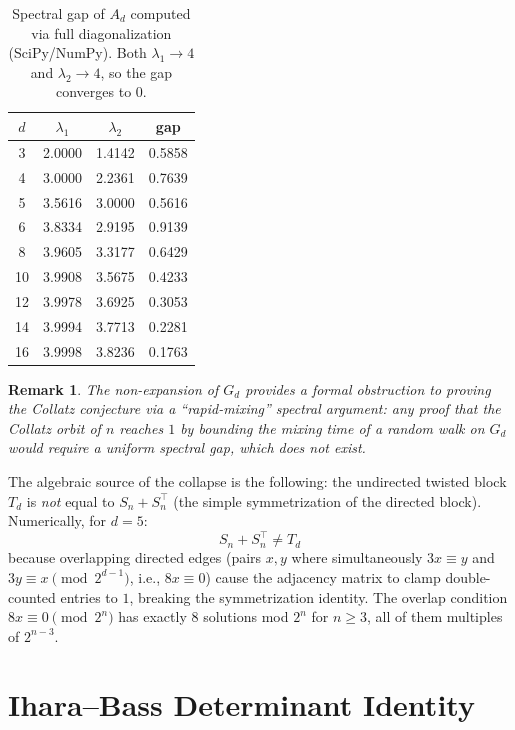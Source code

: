 \documentclass[12pt]{article}
\newtheorem{remark}[theorem]{Remark}
\begin{document}
\begin{table}[h!]
  \centering
  \begin{tabular}{c c c c}
    \hline
    $d$ & $\lambda_1$ & $\lambda_2$ & gap \\
    \hline
    3  & 2.0000 & 1.4142 & 0.5858 \\
    4  & 3.0000 & 2.2361 & 0.7639 \\
    5  & 3.5616 & 3.0000 & 0.5616 \\
    6  & 3.8334 & 2.9195 & 0.9139 \\
    8  & 3.9605 & 3.3177 & 0.6429 \\
    10 & 3.9908 & 3.5675 & 0.4233 \\
    12 & 3.9978 & 3.6925 & 0.3053 \\
    14 & 3.9994 & 3.7713 & 0.2281 \\
    16 & 3.9998 & 3.8236 & 0.1763 \\
    \hline
  \end{tabular}
  \caption{Spectral gap of $A_d$ computed via full diagonalization
    (SciPy/NumPy).  Both $\lambda_1 \to 4$ and $\lambda_2 \to 4$,
    so the gap converges to $0$.}
  \label{tab:gap}
\end{table}

\begin{remark}
  The non-expansion of $G_d$ provides a formal obstruction to proving
  the Collatz conjecture via a ``rapid-mixing'' spectral argument:
  any proof that the Collatz orbit of $n$ reaches $1$ by bounding the
  mixing time of a random walk on $G_d$ would require a uniform spectral
  gap, which does not exist.
\end{remark}

The algebraic source of the collapse is the following:  the undirected
twisted block $T_d$ is \emph{not} equal to $S_n + S_n^{\!\top}$ (the
simple symmetrization of the directed block).  Numerically, for $d = 5$:
\[
  S_n + S_n^{\!\top} \ne T_d
\]
because overlapping directed edges (pairs $x, y$ where simultaneously
$3x \equiv y$ and $3y \equiv x \pmod{2^{d-1}}$, i.e., $8x \equiv 0$)
cause the adjacency matrix to clamp double-counted entries to $1$,
breaking the symmetrization identity.  The overlap condition
$8x \equiv 0 \pmod{2^n}$ has exactly $8$ solutions mod $2^n$ for
$n \ge 3$, all of them multiples of $2^{n-3}$.

\section{Ihara--Bass Determinant Identity}
\label{sec:ihara}
\end{document}
